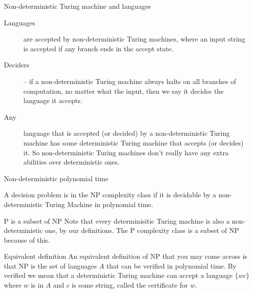 \begin{frame}{Non-deterministic Turing machine and languages}
  \begin{description}
    \item[Languages] are accepted by non-deterministic Turing machines, where an input string is accepted if any branch ends in the accept state.
    \item[Deciders] -- if a non-deterministic Turing machine always halts on all branches of computation, no matter what the input, then we say it decides the language it accepts.
    \item[Any] language that is accepted (or decided) by a non-deterministic Turing machine has some deterministic Turing machine that accepts (or decides) it. So non-deterministic Turing machines don't really have any extra abilities over deterministic ones.
  \end{description}
\end{frame}


\begin{frame}{Non-deterministic polynomial time}
  \begin{definition}
    A decision problem is in the NP complexity class if it is decidable by a non-deterministic Turing Machine in polynomial time.
  \end{definition}
  
  \begin{alertblock}{P is a subset of NP}
    Note that every determinisitic Turing machine is also a non-deterministic one, by our definitions.
    The P complexity class is a subset of NP because of this.
  \end{alertblock}

  \begin{alertblock}{Equivalent definition}
    An equivalent definition of NP that you may come across is that NP is the set of languages $A$ that can be verified in polynomial time.
    By verified we mean that a deterministic Turing machine can accept a language $\{ wc \}$ where $w$ is in $A$ and $c$ is some string, called the certificate for $w$.
  \end{alertblock}

\end{frame}


